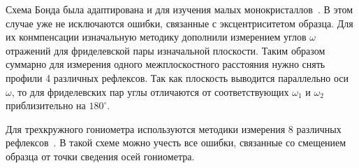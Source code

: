 \documentclass[a4paper, 12pt]{article}
\begin{document}
Схема Бонда была адаптирована и для изучения малых монокристаллов~\cite{Hubbard:1976,Ponomarev:1969}.
В этом случае уже не исключаются ошибки, связанные с эксцентриситетом образца.
Для их конмпенсации изначальную методику дополнили измерением углов $\omega$ отражений для фриделевской пары изначальной плоскости.
Таким образом суммарно для измерения одного межплоскостного расстояния нужно снять профили 4 различных рефлексов.
Так как плоскость выводится параллельно оси $\omega$, то для фриделевских пар углы отличаются от соответствующих $\omega_1$ и $\omega_2$ приблизительно на $180^\circ$.

Для трехкружного гониометра используются методики измерения 8 различных рефлексов~\cite{King:1979}.
В такой схеме можно учесть все ошибки, связанные со смещением образца от точки сведения осей гониометра.




\end{document}
